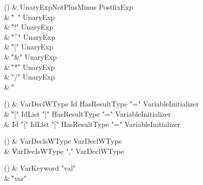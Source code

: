 \begin{bbgrammarappendix}

() & UnaryExpNotPlusMinus \label{prod:UnaryExpNotPlusMinus}  \: PostfixExp  \\

 &    \| \xcd"~" UnaryExp \\
 &    \| \xcd"!" UnaryExp \\
 &    \| \xcd"^" UnaryExp \\
 &    \| \xcd"|" UnaryExp \\
 &    \| \xcd"&" UnaryExp \\
 &    \| \xcd"*" UnaryExp \\
 &    \| \xcd"/" UnaryExp \\
 &    \| \xcd"%

\end{bbgrammarappendix}

\begin{bbgrammarappendix}

() & VarDeclWType \label{prod:VarDeclWType}  \: Id HasResultType \xcd"=" VariableInitializer  \\

 &    \| \xcd"[" IdList \xcd"]" HasResultType \xcd"=" VariableInitializer \\
 &    \| Id \xcd"[" IdList \xcd"]" HasResultType \xcd"=" VariableInitializer \\

\end{bbgrammarappendix}

\begin{bbgrammarappendix}

() & VarDeclsWType \label{prod:VarDeclsWType}  \: VarDeclWType  \\

 &    \| VarDeclsWType \xcd"," VarDeclWType \\

\end{bbgrammarappendix}

\begin{bbgrammarappendix}

() & VarKeyword \label{prod:VarKeyword}  \: \xcd"val"  \\

 &    \| \xcd"var" \\

\end{bbgrammarappendix}

